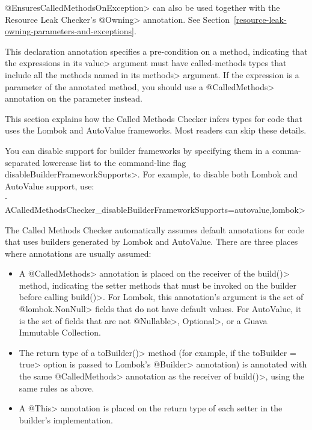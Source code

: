 \begin{description}
  \<@EnsuresCalledMethodsOnException> can also be used together with the Resource Leak Checker's
  \<@Owning> annotation.  See Section~\ref{resource-leak-owning-parameters-and-exceptions}.

\item[\refqualclass{checker/calledmethods/qual}{RequiresCalledMethods}]
  This declaration annotation specifies a pre-condition on a method, indicating that the expressions
  in its \<value> argument must have called-methods types that include all the methods named
  in its \<methods> argument. If the expression is a parameter of the annotated method, you should
  use a \<@CalledMethods> annotation on the parameter instead.

\end{description}


This section explains how the Called Methods Checker infers types for code
that uses the Lombok and AutoValue frameworks. Most readers can skip these
details.

You can disable support for builder frameworks by specifying them in a
comma-separated lowercase list to the command-line flag
\<disableBuilderFrameworkSupports>.  For example, to disable both Lombok
and AutoValue support, use: \\
\<-ACalledMethodsChecker\_disableBuilderFrameworkSupports=autovalue,lombok>

The Called Methods Checker automatically assumes default annotations for code that uses builders generated
by Lombok and AutoValue. There are three places where annotations are usually assumed:
\begin{itemize}
\item A \<@CalledMethods> annotation is placed on the receiver of the
  \<build()> method, indicating the setter methods that must be invoked on
  the builder before calling \<build()>. For Lombok, this annotation's
  argument is the set of \<@lombok.NonNull> fields that do not have default
  values.  For AutoValue, it is the set of fields that are not
  \<@Nullable>, \<Optional>, or a Guava Immutable Collection.
\item The return type of a \<toBuilder()> method (for example, if the
  \<toBuilder = true> option is passed to Lombok's \<@Builder> annotation)
  is annotated with the same \<@CalledMethods> annotation as the receiver
  of \<build()>, using the same rules as above.
\item A \<@This> annotation is placed on the return type of each setter in
  the builder's implementation.
\end{itemize}

